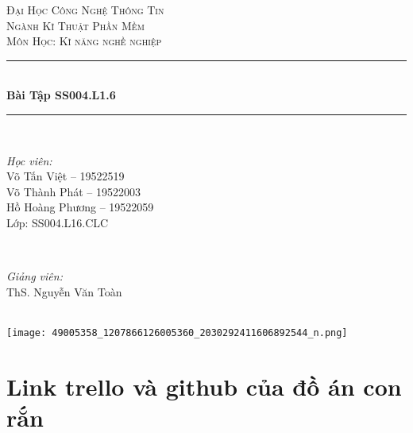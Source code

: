 \documentclass[a4paper,12pt]{article}
\begin{document}
\begin{titlepage}

\newcommand{\HRule}{\rule{\linewidth}{0.5mm}} %

\center %
 

\textsc{\Huge Đại Học Công Nghệ Thông Tin}\\[1.5cm] %
\textsc{\Large Ngành Kĩ Thuật Phần Mềm}\\[0.5cm] %
\textsc{\Large Môn Học: Kĩ năng nghề nghiệp }\\[0.5cm] %

\HRule \\[0.4cm]
{ \huge \bfseries Bài Tập SS004.L1.6}\\[0.4cm] %
\HRule \\[1.5cm]
 
\begin{minipage}{0.4\textwidth}
\begin{flushleft} \Large
\emph{Học viên:}\\
Võ Tấn Việt -- 19522519 \\
Võ Thành Phát -- 19522003 \\
Hồ Hoàng Phương -- 19522059 \\
Lớp: SS004.L16.CLC
\end{flushleft}
\end{minipage}
~
\begin{minipage}{0.4\textwidth}
\begin{flushright} \Large
\emph{Giảng viên:} \\
ThS. Nguyễn Văn Toàn %
\end{flushright}
\end{minipage}\\[2cm]


\texttt{[image: 49005358\_1207866126005360\_2030292411606892544\_n.png]}\\[1cm] %
 

\vfill %

\end{titlepage}




\Large

\section{Link trello và github của đồ án con rắn}
\end{document}
